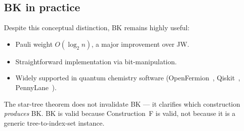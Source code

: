 \subsection{BK in practice}

Despite this conceptual distinction, BK remains highly useful:
\begin{itemize}
  \item Pauli weight $O(\log_2 n)$, a major improvement over JW.
  \item Straightforward implementation via bit-manipulation.
  \item Widely supported in quantum chemistry software
    (OpenFermion~\cite{mcclean2020}, Qiskit~\cite{qiskit2023},
    PennyLane~\cite{bergholm2022}).
\end{itemize}

The star-tree theorem does not invalidate BK --- it clarifies which
construction \emph{produces} BK.  BK is valid because Construction~F
is valid, not because it is a generic tree-to-index-set instance.
